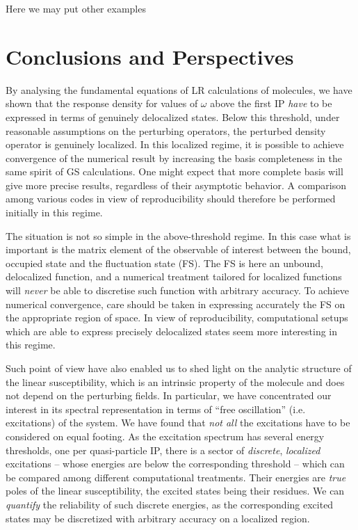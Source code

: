 \documentclass[reprint,aps,prb]{revtex4-1}
\begin{document}
Here we may put other examples


\section{Conclusions and Perspectives}

By analysing the fundamental equations of LR calculations of molecules, we have shown that the response density for values of $\omega$ above the first IP
\emph{have} to be expressed in terms of genuinely delocalized states.
Below this threshold,
under reasonable assumptions on the perturbing operators,
the perturbed density operator is genuinely localized.
In this localized regime, it is possible to achieve convergence of the numerical result
by increasing the basis completeness in the same spirit of GS calculations.
One might expect that more complete basis will give more precise results, regardless of their asymptotic behavior.
A comparison among various codes in view of reproducibility should therefore be performed
initially in this regime.

The situation is not so simple in the above-threshold regime.
In this case what is important is the matrix element of the observable of interest
between the bound, occupied state and the fluctuation state (FS).
The FS is here an unbound, delocalized function, and a numerical treatment tailored for localized functions will \emph{never} be able to discretise such function with arbitrary accuracy.
To achieve numerical convergence, care should be taken in expressing accurately the FS on the
appropriate region of space. In view of reproducibility, computational setups which are able to express precisely
delocalized states seem more interesting in this regime.

Such point of view have also enabled us to shed light on the analytic structure of the
linear susceptibility, which is an intrinsic property of the molecule and does not depend on
 the perturbing fields.
 In particular, we have concentrated our interest in its spectral representation in
 terms of ``free oscillation'' (i.e. excitations) of the system.
 We have found that \emph{not all} the excitations have to be considered on equal footing.
 As the excitation spectrum has several energy thresholds, one per quasi-particle IP,
 there is a sector of \emph{discrete}, \emph{localized} excitations -- whose energies are
below the corresponding threshold -- which can be compared among different computational treatments.
Their energies are \emph{true} poles of the linear susceptibility, the excited states being their residues. We can \emph{quantify} the reliability of such discrete energies, as the corresponding excited states may be discretized with arbitrary accuracy on a localized region.
\end{document}
